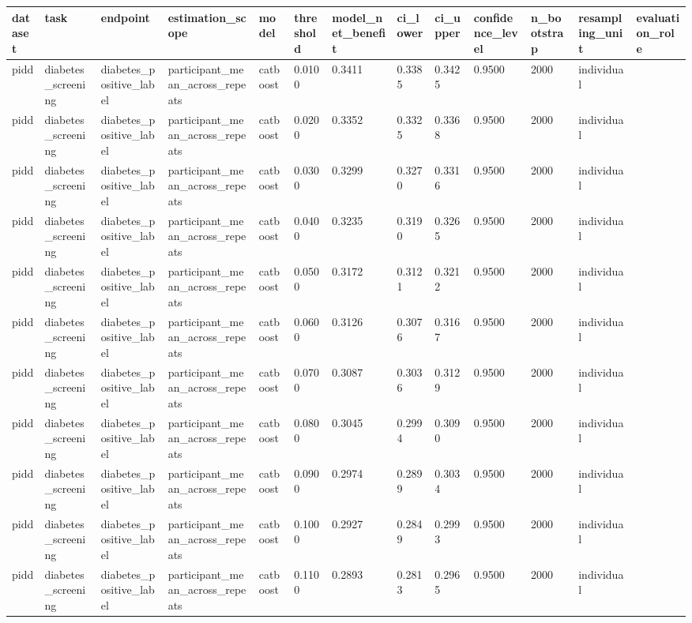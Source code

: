 \begin{tabular}{lllllllllllll}
\hline
dataset & task & endpoint & estimation\_scope & model & threshold & model\_net\_benefit & ci\_lower & ci\_upper & confidence\_level & n\_bootstrap & resampling\_unit & evaluation\_role \\
\hline
pidd & diabetes\_screening & diabetes\_positive\_label & participant\_mean\_across\_repeats & catboost & 0.0100 & 0.3411 & 0.3385 & 0.3425 & 0.9500 & 2000 & individual &  \\
pidd & diabetes\_screening & diabetes\_positive\_label & participant\_mean\_across\_repeats & catboost & 0.0200 & 0.3352 & 0.3325 & 0.3368 & 0.9500 & 2000 & individual &  \\
pidd & diabetes\_screening & diabetes\_positive\_label & participant\_mean\_across\_repeats & catboost & 0.0300 & 0.3299 & 0.3270 & 0.3316 & 0.9500 & 2000 & individual &  \\
pidd & diabetes\_screening & diabetes\_positive\_label & participant\_mean\_across\_repeats & catboost & 0.0400 & 0.3235 & 0.3190 & 0.3265 & 0.9500 & 2000 & individual &  \\
pidd & diabetes\_screening & diabetes\_positive\_label & participant\_mean\_across\_repeats & catboost & 0.0500 & 0.3172 & 0.3121 & 0.3212 & 0.9500 & 2000 & individual &  \\
pidd & diabetes\_screening & diabetes\_positive\_label & participant\_mean\_across\_repeats & catboost & 0.0600 & 0.3126 & 0.3076 & 0.3167 & 0.9500 & 2000 & individual &  \\
pidd & diabetes\_screening & diabetes\_positive\_label & participant\_mean\_across\_repeats & catboost & 0.0700 & 0.3087 & 0.3036 & 0.3129 & 0.9500 & 2000 & individual &  \\
pidd & diabetes\_screening & diabetes\_positive\_label & participant\_mean\_across\_repeats & catboost & 0.0800 & 0.3045 & 0.2994 & 0.3090 & 0.9500 & 2000 & individual &  \\
pidd & diabetes\_screening & diabetes\_positive\_label & participant\_mean\_across\_repeats & catboost & 0.0900 & 0.2974 & 0.2899 & 0.3034 & 0.9500 & 2000 & individual &  \\
pidd & diabetes\_screening & diabetes\_positive\_label & participant\_mean\_across\_repeats & catboost & 0.1000 & 0.2927 & 0.2849 & 0.2993 & 0.9500 & 2000 & individual &  \\
pidd & diabetes\_screening & diabetes\_positive\_label & participant\_mean\_across\_repeats & catboost & 0.1100 & 0.2893 & 0.2813 & 0.2965 & 0.9500 & 2000 & individual &  \\

\end{tabular}
